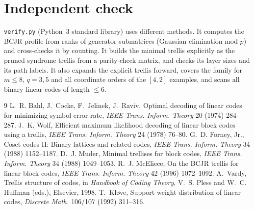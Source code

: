 \documentclass[11pt]{article}
\theoremstyle{definition}
\theoremstyle{remark}
\begin{document}
\section{Independent check}
\texttt{verify.py} (Python~3 standard library) uses different methods. It computes the
BCJR profile from ranks of generator submatrices (Gaussian elimination mod $p$) and
cross-checks it by counting. It builds the minimal trellis explicitly as the pruned
syndrome trellis from a parity-check matrix, and checks its layer sizes and its path labels.
It also expands the explicit trellis forward, covers the family for $m\le8$, $q=3,5$ and
all coordinate orders of the $[4,2]$ examples, and scans all binary linear codes of length $\le6$.

\begin{thebibliography}{9}
 L.~R. Bahl, J.~Cocke, F.~Jelinek, J.~Raviv, Optimal decoding of linear
codes for minimizing symbol error rate, \emph{IEEE Trans. Inform. Theory} 20 (1974) 284--287.
 J.~K. Wolf, Efficient maximum likelihood decoding of linear block codes
using a trellis, \emph{IEEE Trans. Inform. Theory} 24 (1978) 76--80.
 G.~D. Forney, Jr., Coset codes II: Binary lattices and related codes,
\emph{IEEE Trans. Inform. Theory} 34 (1988) 1152--1187.
 D.~J. Muder, Minimal trellises for block codes, \emph{IEEE Trans. Inform.
Theory} 34 (1988) 1049--1053.
 R.~J. McEliece, On the BCJR trellis for linear block codes,
\emph{IEEE Trans. Inform. Theory} 42 (1996) 1072--1092.
 A.~Vardy, Trellis structure of codes, in \emph{Handbook of Coding Theory},
V.~S. Pless and W.~C. Huffman (eds.), Elsevier, 1998.
 T.~Kl{\o}ve, Support weight distribution of linear codes, \emph{Discrete
Math.} 106/107 (1992) 311--316.
\end{thebibliography}
\end{document}
